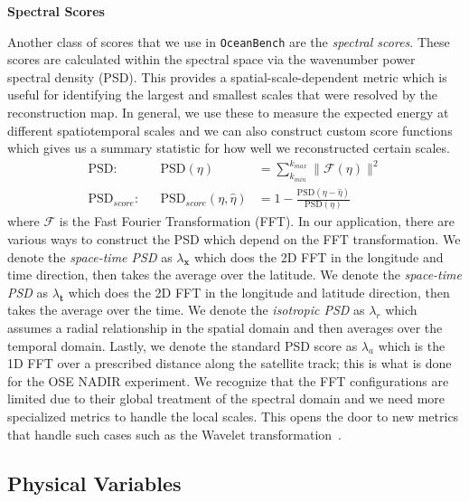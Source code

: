 \textbf{Spectral Scores}

Another class of scores that we use in \texttt{OceanBench} are the \textit{spectral scores}. These scores are calculated within the spectral space via the wavenumber power spectral density (PSD). 
This provides a spatial-scale-dependent metric which is useful for identifying the largest and smallest scales that were resolved by the reconstruction map. 
In general, we use these to measure the expected energy at different spatiotemporal scales and we can also construct custom score functions which gives us a summary statistic for how well we reconstructed certain scales.
%
\begin{align}
    \text{PSD}: &&\text{PSD}(\eta) &= \sum_{k_{min}}^{k_{max}}\|\mathcal{\mathcal{F}(\eta)}\|^2\label{psd}\\
    \text{PSD}_{score}: &&\text{PSD}_{score}(\eta,\hat{\eta}) &= 1 - \frac{\text{PSD}(\eta - \hat{\eta})}{\text{PSD}(\eta)} \label{eq:psd_score}
\end{align}
%
where $\mathcal{F}$ is the Fast Fourier Transformation (FFT). 
In our application, there are various ways to construct the PSD which depend on the FFT transformation.
We denote the \textit{space-time PSD} as $\lambda_\mathbf{x}$ which does the 2D FFT in the longitude and time direction, then takes the average over the latitude.
We denote the \textit{space-time PSD} as $\lambda_\mathbf{t}$ which does the 2D FFT in the longitude and latitude direction, then takes the average over the time.
We denote the \textit{isotropic PSD} as $\lambda_r$ which assumes a radial relationship in the spatial domain and then averages over the temporal domain.
Lastly, we denote the standard PSD score as $\lambda_a$ which is the 1D FFT over a prescribed distance along the satellite track; this is what is done for the OSE NADIR experiment.
We recognize that the FFT configurations are limited due to their global treatment of the spectral domain and we need more specialized metrics to handle the local scales.
This opens the door to new metrics that handle such cases such as the Wavelet transformation~\cite{METRICSWAVELET}.




\subsection*{Physical Variables} \label{sec:physical_variables}

